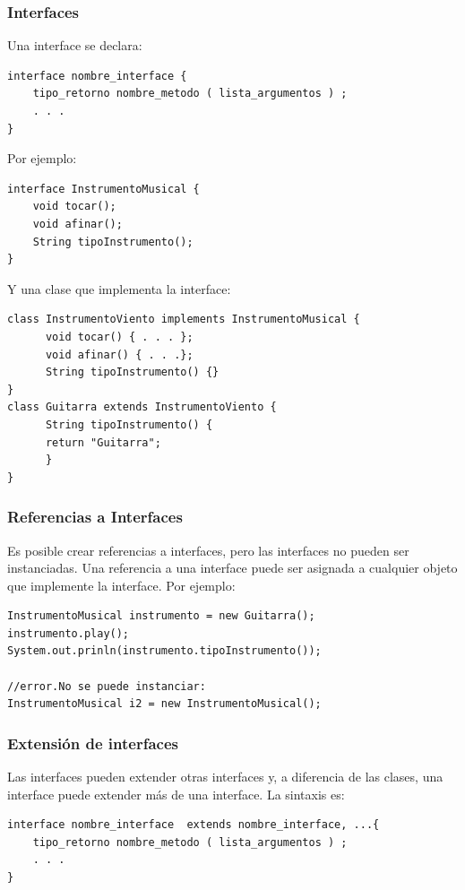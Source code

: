 \documentclass{beamer}
\begin{document}
\begin{frame}[fragile]
\frametitle{Interfaces}
Una interface se declara:
{\color{blue}
\begin{verbatim}
interface nombre_interface {
    tipo_retorno nombre_metodo ( lista_argumentos ) ;
    . . . 
}
\end{verbatim}}
\pause
Por ejemplo:
\begin{footnotesize}
{\color{blue}
\begin{verbatim}
interface InstrumentoMusical {
    void tocar();
    void afinar();
    String tipoInstrumento();
}
\end{verbatim}}
\end{footnotesize}
\pause
Y una clase que implementa la interface:
\begin{scriptsize}
{\color{blue}
\begin{verbatim}
class InstrumentoViento implements InstrumentoMusical {
      void tocar() { . . . };
      void afinar() { . . .};
      String tipoInstrumento() {}
}
class Guitarra extends InstrumentoViento {
      String tipoInstrumento() {
      return "Guitarra";
      }
}   
\end{verbatim}}
\end{scriptsize}
\end{frame}


\begin{frame}[fragile]
\frametitle{Referencias a Interfaces}
Es posible crear referencias a interfaces, pero las interfaces no pueden ser instanciadas. Una referencia a una interface puede ser asignada a cualquier objeto que implemente la interface. Por ejemplo:
{\color{magenta}
\begin{verbatim}
InstrumentoMusical instrumento = new Guitarra();
instrumento.play();
System.out.prinln(instrumento.tipoInstrumento());

//error.No se puede instanciar:
InstrumentoMusical i2 = new InstrumentoMusical(); 
\end{verbatim}}
\end{frame}

\begin{frame}[fragile]
\frametitle{Extensión de interfaces}
Las interfaces pueden extender otras interfaces y, a diferencia de las clases, una interface puede extender más de una interface. La sintaxis es:
{\color{cyan}
\begin{verbatim}
interface nombre_interface  extends nombre_interface, ...{
    tipo_retorno nombre_metodo ( lista_argumentos ) ;
    . . . 
}
\end{verbatim}}
\end{frame}
\end{document}
